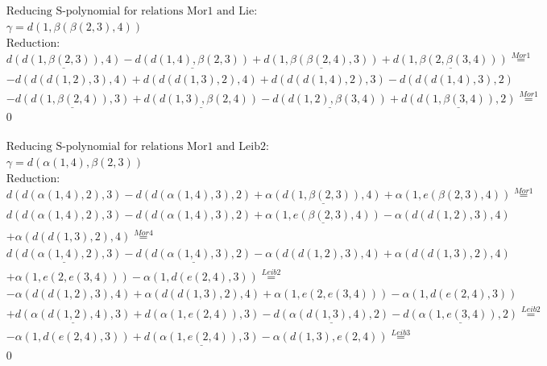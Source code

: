 \documentclass[11pt]{amsart}
\begin{document}
\begin{align*} 
& \text{Reducing S-polynomial for relations Mor1 and Lie:} \\ 
& \gamma = d(1,\beta(\beta(2,3),4)) \\ 
& \text{Reduction}: \\&\underline{d(d(1,\beta(2,3)),4)} - \underline{d(d(1,4),\beta(2,3))} + \underline{d(1,\beta(\beta(2,4),3))} + \underline{d(1,\beta(2,\beta(3,4)))} \stackrel{ Mor1 }{=}  \\ 
& - d(d(d(1,2),3),4) + d(d(d(1,3),2),4) + d(d(d(1,4),2),3) - d(d(d(1,4),3),2)\\ 
 &  - \underline{d(d(1,\beta(2,4)),3)} + \underline{d(d(1,3),\beta(2,4))} - \underline{d(d(1,2),\beta(3,4))} + \underline{d(d(1,\beta(3,4)),2)} \stackrel{ Mor1 }{=}  \\ 
&0\\ 
\end{align*} 
 
\begin{align*} 
& \text{Reducing S-polynomial for relations Mor1 and Leib2:} \\ 
& \gamma = d(\alpha(1,4),\beta(2,3)) \\ 
& \text{Reduction}: \\&d(d(\alpha(1,4),2),3) - d(d(\alpha(1,4),3),2) + \underline{\alpha(d(1,\beta(2,3)),4)} + \alpha(1,e(\beta(2,3),4)) \stackrel{ Mor1 }{=}  \\ 
&d(d(\alpha(1,4),2),3) - d(d(\alpha(1,4),3),2) + \underline{\alpha(1,e(\beta(2,3),4))} - \alpha(d(d(1,2),3),4)\\ 
 &  + \alpha(d(d(1,3),2),4) \stackrel{ Mor4 }{=}  \\ 
&\underline{d(d(\alpha(1,4),2),3)} - \underline{d(d(\alpha(1,4),3),2)} - \alpha(d(d(1,2),3),4) + \alpha(d(d(1,3),2),4)\\ 
 &  + \alpha(1,e(2,e(3,4))) - \alpha(1,d(e(2,4),3)) \stackrel{ Leib2 }{=}  \\ 
& - \alpha(d(d(1,2),3),4) + \alpha(d(d(1,3),2),4) + \alpha(1,e(2,e(3,4))) - \alpha(1,d(e(2,4),3))\\ 
 &  + \underline{d(\alpha(d(1,2),4),3)} + d(\alpha(1,e(2,4)),3) - \underline{d(\alpha(d(1,3),4),2)} - \underline{d(\alpha(1,e(3,4)),2)} \stackrel{ Leib2 }{=}  \\ 
& - \alpha(1,d(e(2,4),3)) + \underline{d(\alpha(1,e(2,4)),3)} - \alpha(d(1,3),e(2,4)) \stackrel{ Leib3 }{=}  \\ 
&0\\ 
\end{align*} 
 
\end{document}
